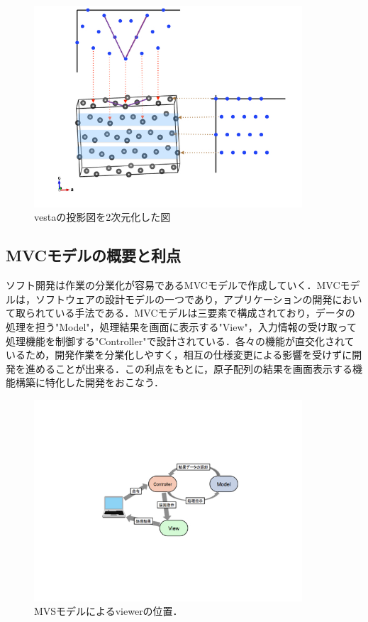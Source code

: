 \begin{figure}[htbp]\begin{center}
\includegraphics[width=10cm,bb= 0 0 737 553]{../figs/./boundary_narita.007.jpeg}
\caption{vestaの投影図を2次元化した図}
\label{default}\end{center}\end{figure}
\subsection{MVCモデルの概要と利点}
ソフト開発は作業の分業化が容易であるMVCモデルで作成していく．MVCモデルは，ソフトウェアの設計モデルの一つであり，アプリケーションの開発において取られている手法である．MVCモデルは三要素で構成されており，データの処理を担う"Model"，処理結果を画面に表示する"View"，入力情報の受け取って処理機能を制御する"Controller"で設計されている．各々の機能が直交化されているため，開発作業を分業化しやすく，相互の仕様変更による影響を受けずに開発を進めることが出来る\cite{MVC}．この利点をもとに，原子配列の結果を画面表示する機能構築に特化した開発をおこなう．

\begin{figure}[htbp]\begin{center}
\includegraphics[width=10cm,bb= 0 0 737 553]{../figs/./boundary_narita.005.jpeg}
\caption{MVSモデルによるviewerの位置．}
\label{default}\end{center}\end{figure}
